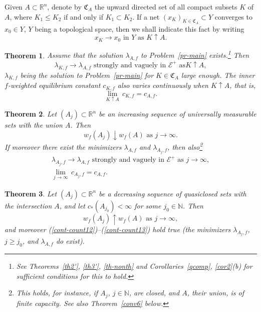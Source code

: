 \documentclass[12pt,a4paper,reqno]{amsart} %
\theoremstyle{lause}
\theoremstyle{maaritelma}
\theoremstyle{lause}
\newtheorem{theorem}{Theorem}[section]
\theoremstyle{maaritelma}
\numberwithin{equation}{section}
\begin{document}
Given $A\subset\mathbb R^n$, denote by $\mathfrak C_A$ the upward directed set of all compact subsets $K$ of $A$, where $K_1\leqslant K_2$ if and only if $K_1\subset K_2$. If a net $(x_K)_{K\in\mathfrak C_A}\subset Y$ converges to $x_0\in Y$, $Y$ being a topological space, then we shall indicate this fact by writing
\begin{equation*}x_K\to x_0\text{ \ in $Y$ as $K\uparrow A$}.\end{equation*}

\begin{theorem}\label{th4'} Assume that the solution $\lambda_{A,f}$ to Problem~{\rm\ref{pr-main}} exists.\footnote{See Theorems~\ref{th2'}, \ref{th3'}, \ref{th-nonth} and Corollaries~\ref{qcomp}, \ref{cor2}(b) for sufficient conditions for this to hold.} Then
\begin{equation}\label{conv2}\lambda_{K,f}\to\lambda_{A,f}\text{ \ strongly and vaguely in $\mathcal E^+$ as
$K\uparrow A$},\end{equation}
$\lambda_{K,f}$ being the solution to Problem~{\rm\ref{pr-main}} for $K\in\mathfrak C_A$ large enough.
The inner $f$-wei\-g\-h\-t\-ed equilibrium constant $c_{K,f}$ also varies continuously when $K\uparrow A$, that is,
\begin{equation}\label{conv3}\lim_{K\uparrow A}\,c_{K,f}=c_{A,f}.\end{equation}
\end{theorem}

\begin{theorem}\label{th4'c}Let $(A_j)\subset\mathbb R^n$ be an increasing sequence of universally measurable sets with the union $A$. Then
\begin{equation}\label{cont-count1}
w_f(A_j)\downarrow w_f(A)\text{ \ as $j\to\infty$}.
\end{equation}
If moreover there exist the minimizers $\lambda_{A,f}$ and $\lambda_{A_j,f}$, then also\footnote{This holds, for instance, if $A_j$, $j\in\mathbb N$, are closed, and $A$, their union, is of finite capacity. See also Theorem~\ref{conv6} below.\label{th4'cf}}
\begin{gather}
\label{cont-count12}\lambda_{A_j,f}\to\lambda_{A,f}\text{ \ strongly and vaguely in $\mathcal E^+$ as $j\to\infty$},\\
\label{cont-count13}\lim_{j\to\infty}\,c_{A_j,f}=c_{A,f}.
\end{gather}
\end{theorem}

\begin{theorem}\label{th4'c2}Let $(A_j)\subset\mathbb R^n$ be a decreasing sequence of quasiclosed sets with the intersection $A$, and let $c_*(A_{j_0})<\infty$ for some $j_0\in\mathbb N$. Then
\begin{equation}\label{cont-count1d}
w_f(A_j)\uparrow w_f(A)\text{ \ as $j\to\infty$},
\end{equation}
and moreover {\rm(\ref{cont-count12})}--{\rm(\ref{cont-count13})} hold true {\rm(}the minimizers $\lambda_{A_j,f}$, $j\geqslant j_0$, and $\lambda_{A,f}$ do exist{\rm)}.\end{theorem}
\end{document}
